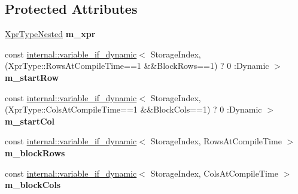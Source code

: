 \subsection*{Protected Attributes}
\begin{DoxyCompactItemize}
\item 
\mbox{\label{class_eigen_1_1internal_1_1_block_impl__dense_a8abb3255400f15ed99ce723c49615c0a}} 
\mbox{\hyperlink{struct_eigen_1_1internal_1_1true__type}{Xpr\+Type\+Nested}} {\bfseries m\+\_\+xpr}
\item 
\mbox{\label{class_eigen_1_1internal_1_1_block_impl__dense_a8b4026b1f4826e03f8a6607e367b1d9e}} 
const \mbox{\hyperlink{class_eigen_1_1internal_1_1variable__if__dynamic}{internal\+::variable\+\_\+if\+\_\+dynamic}}$<$ Storage\+Index,(Xpr\+Type\+::\+Rows\+At\+Compile\+Time==1 \&\&Block\+Rows==1) ? 0 \+:Dynamic $>$ {\bfseries m\+\_\+start\+Row}
\item 
\mbox{\label{class_eigen_1_1internal_1_1_block_impl__dense_a134bccd933a58975a09aa29e7ed892e8}} 
const \mbox{\hyperlink{class_eigen_1_1internal_1_1variable__if__dynamic}{internal\+::variable\+\_\+if\+\_\+dynamic}}$<$ Storage\+Index,(Xpr\+Type\+::\+Cols\+At\+Compile\+Time==1 \&\&Block\+Cols==1) ? 0 \+:Dynamic $>$ {\bfseries m\+\_\+start\+Col}
\item 
\mbox{\label{class_eigen_1_1internal_1_1_block_impl__dense_ac291975b43fca46500549c74c1a0c4e1}} 
const \mbox{\hyperlink{class_eigen_1_1internal_1_1variable__if__dynamic}{internal\+::variable\+\_\+if\+\_\+dynamic}}$<$ Storage\+Index, Rows\+At\+Compile\+Time $>$ {\bfseries m\+\_\+block\+Rows}
\item 
\mbox{\label{class_eigen_1_1internal_1_1_block_impl__dense_a7a23a026eb66e97b013232ad51484787}} 
const \mbox{\hyperlink{class_eigen_1_1internal_1_1variable__if__dynamic}{internal\+::variable\+\_\+if\+\_\+dynamic}}$<$ Storage\+Index, Cols\+At\+Compile\+Time $>$ {\bfseries m\+\_\+block\+Cols}
\end{DoxyCompactItemize}


